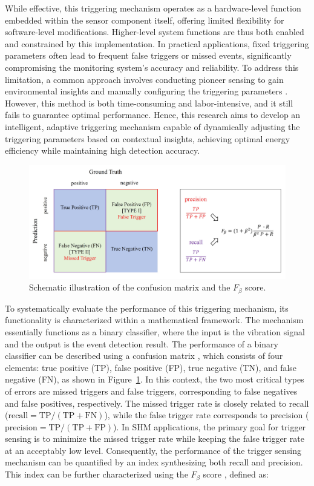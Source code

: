 \documentclass[a4paper,fleqn,numbers,sort&compress]{cas-sc}
\begin{document}
While effective, this triggering mechanism operates as a hardware-level function embedded within the sensor component itself, offering limited flexibility for software-level modifications. Higher-level system functions are thus both enabled and constrained by this implementation. In practical applications, fixed triggering parameters often lead to frequent false triggers or missed events, significantly compromising the monitoring system's accuracy and reliability. To address this limitation, a common approach involves conducting pioneer sensing to gain environmental insights and manually configuring the triggering parameters \citep{fu_suddenevent_2019}. However, this method is both time-consuming and labor-intensive, and it still fails to guarantee optimal performance. Hence, this research aims to develop an intelligent, adaptive triggering mechanism capable of dynamically adjusting the triggering parameters based on contextual insights, achieving optimal energy efficiency while maintaining high detection accuracy.

\begin{figure}[htbp]
    \centering
    \includegraphics[width=0.85\linewidth]{Fig4.jpg}
    \caption{Schematic illustration of the confusion matrix and the $F_{\beta}$ score.}
    \label{fig:Performance Characterization}
\end{figure}

To systematically evaluate the performance of this triggering mechanism, its functionality is characterized within a mathematical framework. The mechanism essentially functions as a binary classifier, where the input is the vibration signal and the output is the event detection result. The performance of a binary classifier can be described using a confusion matrix \citep{bishop_deep_2024}, which consists of four elements: true positive (TP), false positive (FP), true negative (TN), and false negative (FN), as shown in Figure~\ref{fig:Performance Characterization}. In this context, the two most critical types of errors are missed triggers and false triggers, corresponding to false negatives and false positives, respectively. The missed trigger rate is closely related to recall (\(\text{recall} = \text{TP}/(\text{TP} + \text{FN})\)), while the false trigger rate corresponds to precision (\(\text{precision} = \text{TP}/(\text{TP} + \text{FP})\)). In SHM applications, the primary goal for trigger sensing is to minimize the missed trigger rate while keeping the false trigger rate at an acceptably low level. Consequently, the performance of the trigger sensing mechanism can be quantified by an index synthesizing both recall and precision. This index can be further characterized using the $F_{\beta}$ score \citep{bishop_deep_2024}, defined as:
\end{document}
